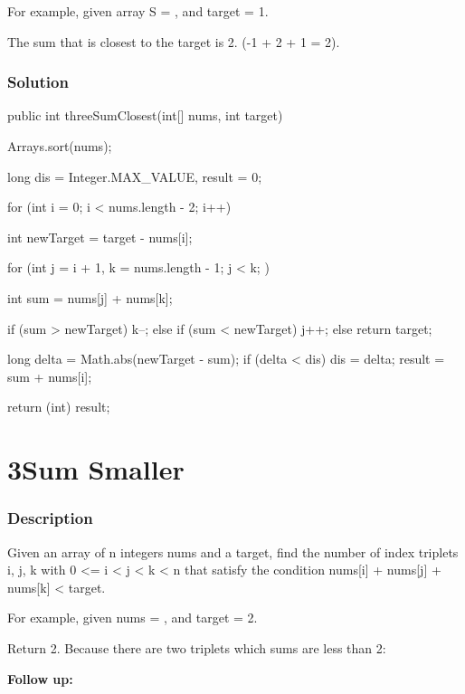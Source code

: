 For example, given array S = , and target = 1.

The sum that is closest to the target is 2. (-1 + 2 + 1 = 2).

\subsubsection{Solution}

\begin{Code}
public int threeSumClosest(int[] nums, int target) {
    Arrays.sort(nums);

    long dis = Integer.MAX_VALUE, result = 0;

    for (int i = 0; i < nums.length - 2; i++) {
        int newTarget = target - nums[i];

        for (int j = i + 1, k = nums.length - 1; j < k; ) {
            int sum = nums[j] + nums[k];

            if (sum > newTarget) {
                k--;
            } else if (sum < newTarget) {
                j++;
            } else {
                return target;
            }

            long delta = Math.abs(newTarget - sum);
            if (delta < dis) {
                dis = delta;
                result = sum + nums[i];
            }
        }
    }

    return (int) result;
}
\end{Code}

\newpage

\section{3Sum Smaller} %

\subsubsection{Description}
Given an array of n integers nums and a target, find the number of index triplets i, j, k with 0 <= i < j < k < n that satisfy the condition nums[i] + nums[j] + nums[k] < target.

For example, given nums = \code{[-2, 0, 1, 3]}, and target = 2.

Return 2. Because there are two triplets which sums are less than 2:
\begin{Code}
[-2, 0, 1]
[-2, 0, 3]
\end{Code}

\textbf{Follow up:}

